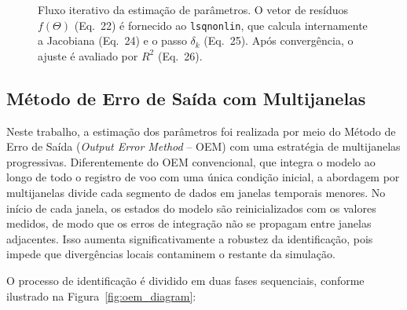 \documentclass[letterpaper, 10 pt, conference]{ieeeconf}
\begin{document}
\begin{figure}[htbp]
\caption{Fluxo iterativo da estima\c{c}\~ao de par\^ametros. O vetor de res\'iduos $f(\Theta)$ (Eq.~22) \'e fornecido ao \texttt{lsqnonlin}, que calcula internamente a Jacobiana (Eq.~24) e o passo $\delta_k$ (Eq.~25). Ap\'os converg\^encia, o ajuste \'e avaliado por $R^2$ (Eq.~26).}
\label{fig:opt_loop}
\end{figure}

\subsection{Método de Erro de Saída com Multijanelas}

Neste trabalho, a estimação dos parâmetros foi realizada por meio do Método de Erro de Saída (\textit{Output Error Method} -- OEM) com uma estratégia de multijanelas progressivas. Diferentemente do OEM convencional, que integra o modelo ao longo de todo o registro de voo com uma única condição inicial, a abordagem por multijanelas divide cada segmento de dados em janelas temporais menores. No início de cada janela, os estados do modelo são reinicializados com os valores medidos, de modo que os erros de integração não se propagam entre janelas adjacentes. Isso aumenta significativamente a robustez da identificação, pois impede que divergências locais contaminem o restante da simulação.

O processo de identificação é dividido em duas fases sequenciais, conforme ilustrado na Figura~\ref{fig:oem_diagram}:
\end{document}
